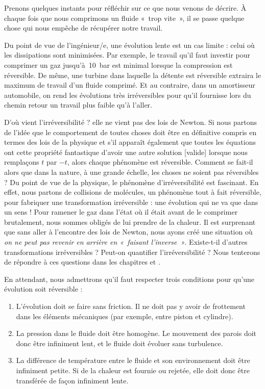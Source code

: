 		Prenons quelques instants pour réfléchir sur ce que nous venons de décrire. À chaque fois que nous comprimons un fluide «~trop vite~», il se passe quelque chose qui nous empêche de récupérer notre travail.
		
		Du point de vue de l’ingénieur/e, une évolution lente est un cas limite : celui où les dissipations sont minimisées. Par exemple, le travail qu’il faut investir pour comprimer un gaz jusqu’à~\SI{10}{\bar} est minimal lorsque la compression est réversible. De même, une turbine dans laquelle la détente est réversible extraira le maximum de travail d’un fluide comprimé. Et au contraire, dans un amortisseur automobile, on rend les évolutions très irréversibles pour qu’il fournisse lors du chemin retour un travail plus faible qu’à l’aller.
		
		D’où vient l’irréversibilité ? elle ne vient pas des lois de Newton. Si nous partons de l’idée que le comportement de toutes choses doit être en définitive compris en termes des lois de la physique et s’il apparaît également que toutes les équations ont cette propriété fantastique d’avoir une autre solution [valide] lorsque nous remplaçons $t$ par $-t$, alors chaque phénomène est réversible. Comment se fait-il alors que dans la nature, à une grande échelle, les choses ne soient pas réversibles ?
		Du point de vue de la physique, le phénomène d’irréversibilité est fascinant. En effet, nous partons de collisions de molécules, un phénomène tout à fait réversible, pour fabriquer une transformation irréversible : une évolution qui ne va que dans un sens ! Pour ramener le gaz dans l’état où il était avant de le comprimer brutalement, nous sommes obligés de lui prendre de la chaleur. Il est surprenant que sans aller à l’encontre des lois de Newton, nous ayons créé une situation où \emph{on ne peut pas revenir en arrière en «~faisant l’inverse~»}. Existe-t-il d’autres transformations irréversibles ? Peut-on quantifier l’irréversibilité ? Nous tenterons de répondre à ces questions dans les chapitres \coursseptplural et \courshuitplural.

		En attendant, nous admettrons qu’il faut respecter trois conditions pour qu’une évolution soit réversible :

		\begin{enumerate}
			\item L’évolution doit se faire sans friction. Il ne doit pas y avoir de frottement dans les éléments mécaniques (par exemple, entre piston et cylindre).
			\item La pression dans le fluide doit être homogène. Le mouvement des parois doit donc être infiniment lent, et le fluide doit évoluer sans turbulence.
			\item La différence de température entre le fluide et son environnement doit être infiniment petite. Si de la chaleur est fournie ou rejetée, elle doit donc être transférée de façon infiniment lente.
		\end{enumerate}

